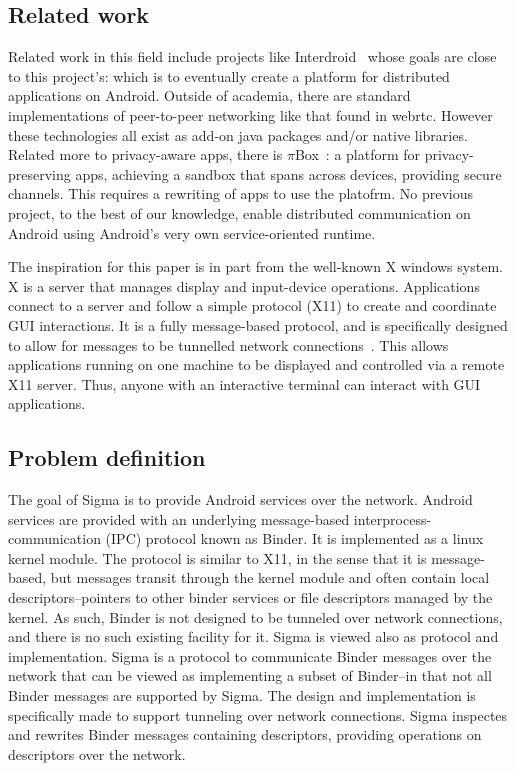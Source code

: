 \documentclass[prodmode]{acmlarge}
\begin{document}
\subsection{Related work}
Related work in this field include projects like Interdroid~\cite{Interdroid} whose goals are close to this project's: which is to eventually create a platform for distributed applications on Android. Outside of academia, there are standard implementations of peer-to-peer networking like that found in webrtc. However these technologies all exist as add-on java packages and/or native libraries. Related more to privacy-aware apps, there is $\pi$Box~\cite{piBox}: a platform for privacy-preserving apps, achieving a sandbox that spans across devices, providing secure channels. This requires a rewriting of apps to use the platofrm. No previous project, to the best of our knowledge, enable distributed communication on Android using Android's very own service-oriented runtime.

The inspiration for this paper is in part from the well-known X windows system. X is a server that manages display and input-device operations. Applications connect to a server and follow a simple protocol (X11) to create and coordinate GUI interactions. It is a fully message-based protocol, and is specifically designed to allow for messages to be tunnelled network connections~\cite{X11}. This allows applications running on one machine to be displayed and controlled via a remote X11 server. Thus, anyone with an interactive terminal can interact with GUI applications.

\subsection{Problem definition}

The goal of Sigma is to provide Android services over the network. Android services are provided with an underlying message-based interprocess-communication (IPC) protocol known as Binder. It is implemented as a linux kernel module. The protocol is similar to X11, in the sense that it is message-based, but messages transit through the kernel module and often contain local descriptors--pointers to other binder services or file descriptors managed by the kernel. As such, Binder is not designed to be tunneled over network connections, and there is no such existing facility for it. Sigma is viewed also as protocol and implementation. Sigma is a protocol to communicate Binder messages over the network that can be viewed as implementing a subset of Binder--in that not all Binder messages are supported by Sigma. The design and implementation is specifically made to support tunneling over network connections. Sigma inspectes and rewrites Binder messages containing descriptors, providing operations on descriptors over the network.
\end{document}
